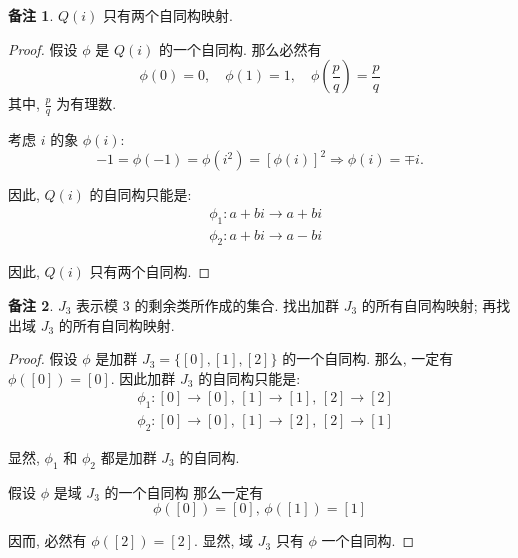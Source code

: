 \documentclass[utf8]{ctexbook}
\theoremstyle{definition}
\newtheorem{memo}{备注}[section]
\begin{document}
\begin{memo}
$Q(i)$ 只有两个自同构映射.
\end{memo}

\begin{proof}
假设 $\phi$ 是 $Q(i)$ 的一个自同构. 那么必然有
\begin{equation}
\phi(0) = 0, \quad \phi(1) = 1, \quad \phi(\frac{p}{q}) = \frac{p}{q}
\end{equation}
其中, $\frac{p}{q}$ 为有理数.

考虑 $i$ 的象 $\phi(i)$:
\begin{equation}
-1 = \phi(-1) = \phi(i^2) = [\phi(i)]^2 \Longrightarrow \phi(i) = \mp i .
\end{equation}

因此, $Q(i)$ 的自同构只能是:
\begin{align*}
& \phi_1 : a + bi \longrightarrow a + bi \\
& \phi_2 : a + bi \longrightarrow a - bi
\end{align*}

因此, $Q(i)$ 只有两个自同构.

\end{proof}


\begin{memo}
$J_3$ 表示模 $3$ 的剩余类所作成的集合. 找出加群 $J_3$ 的所有自同构映射; 再找出域 $J_3$ 的所有自同构映射.
\end{memo}

\begin{proof}
假设 $\phi$ 是加群 $J_3 = \{[0], [1], [2] \}$ 的一个自同构. 那么, 一定有 $\phi([0]) = [0]$. 因此加群 $J_3$ 的自同构只能是:
\begin{align*}
& \phi_1 : [0] \rightarrow [0], \, [1] \rightarrow [1], \, [2] \rightarrow [2] \\
& \phi_2 : [0] \rightarrow [0], \, [1] \rightarrow [2], \, [2] \rightarrow [1]
\end{align*}

显然, $\phi_1$ 和 $\phi_2 $ 都是加群 $J_3$ 的自同构.

假设 $\phi$ 是域 $J_3$ 的一个自同构 那么一定有
\begin{equation}
\phi([0]) = [0] ,\, \phi([1]) = [1] 
\end{equation}

因而, 必然有 $\phi([2]) = [2]$. 显然, 域 $J_3$ 只有 $\phi$ 一个自同构.


\end{proof}
\end{document}
